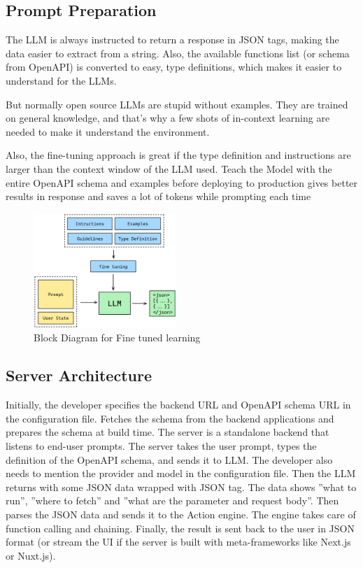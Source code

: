 \documentclass[conference]{IEEEtran}
\begin{document}
\subsection{Prompt Preparation}

The LLM is always instructed to return a response in JSON tags, making the data
easier to extract from a string. Also, the available functions list (or schema
from OpenAPI) is converted to easy, type definitions, which makes it easier to
understand for the LLMs.

But normally open source LLMs are stupid without examples. They are trained on
general knowledge, and that's why a few shots of in-context learning are needed
to make it understand the environment.

Also, the fine-tuning approach is great if the type definition and instructions
are larger than the context window of the LLM used. Teach the Model with the
entire OpenAPI schema and examples before deploying to production gives better
results in response and saves a lot of tokens while prompting each time

\begin{figure}[htbp]
    \centering
    \includegraphics[width=0.48\textwidth]{images/fine-tuned.png}
    \caption{Block Diagram for Fine tuned learning}
    \label{fig}
\end{figure}

\subsection{Server Architecture}
Initially, the developer specifies the backend URL and OpenAPI schema URL in
the configuration file. Fetches the schema from the backend applications and
prepares the schema at build time. The server is a standalone backend that
listens to end-user prompts. The server takes the user prompt, types the
definition of the OpenAPI schema, and sends it to LLM. The developer also needs
to mention the provider and model in the configuration file. Then the LLM
returns with some JSON data wrapped with JSON tag. The data shows ”what to
run”, ”where to fetch” and ”what are the parameter and request body”. Then
parses the JSON data and sends it to the Action engine. The engine takes care
of function calling and chaining. Finally, the result is sent back to the user
in JSON format (or stream the UI if the server is built with meta-frameworks
like Next.js or Nuxt.js).
\end{document}
